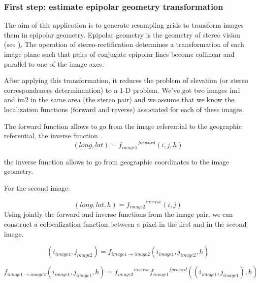 \subsubsection{First step: estimate epipolar geometry transformation}
The aim of this application is to generate resampling grids to transform images them in epipolar geometry.
Epipolar geometry is the geometry of stereo vision (see \href{http://en.wikipedia.org/wiki/Epipolar_geometry}). The operation of stereo-rectification determines a transformation of each image plane such that pairs of conjugate epipolar lines become collinear and parallel to one of the image axes.

After applying this transformation, it reduces the problem of elevation (or stereo correspondences determinantion) to a 1-D problem.
We've got two images im1 and im2 in the same area (the stereo pair) and we assume that we know the localization functions (forward and reverse) associated for each of these images.

The forward function allows to go from the image referential to the geographic referential, the inverse function .
\begin{equation}
   (long,lat) = {f_{image1}}^{forward}(i,j,h)
\end{equation}

the inverse function allows to go from geographic coordinates to the image geometry.

For the second image:

\begin{equation}
   (long,lat,h) = {f_{image2}}^{inverse}(i,j)
\end{equation}
Using jointly the forward and inverse functions from the image pair, we can construct a colocalization function between a pixel in the first and in the second image.



\begin{equation}
(i_{image1},j_{image2}) = f_{image1 \rightarrow image2} (i_{image1} , j_{image2} , h)
\end{equation}

\begin{equation}
f_{image1 \rightarrow image2} (i_{image1} , j_{image1} , h) =  {f_{image2}}^{inverse} {f_{image1}}^{forward}((i_{image1} , j_{image1} ), h)
\end{equation}

